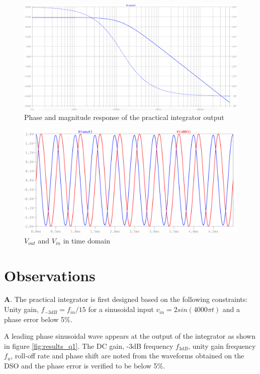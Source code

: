 \documentclass[12pt, titlepage]{article}
\theoremstyle{definition}
\begin{document}
    \begin{figure}[h]
      \centering
      \includegraphics[scale=0.3]{sim_plot_fd}
      \caption{Phase and magnitude response of the practical integrator output}
    \end{figure}
    \begin{figure}[h]
      \centering
      \includegraphics[scale=0.5]{sim_plot_td}
      \caption{$V_{out}$ and $V_{in}$ in time domain}
    \end{figure}


  \newpage
  \section{Observations}
    \textbf{A}. The practical integrator is first designed based on the following constraints:
    Unity gain, $f_{-3dB} = f_{in}/15$ for a sinusoidal input
    $v_{in} = 2 sin(4000\pi t)$ and a phase error below 5\%.

    A leading phase sinusoidal wave appears at the output of the integrator as shown in figure \ref{fig:results_q1}.
    The DC gain, -3dB frequency $f_{3dB}$, unity gain frequency $f_u$, roll-off rate and phase shift are noted from the waveforms obtained on the DSO and the phase error is verified to be below 5\%.
\end{document}
